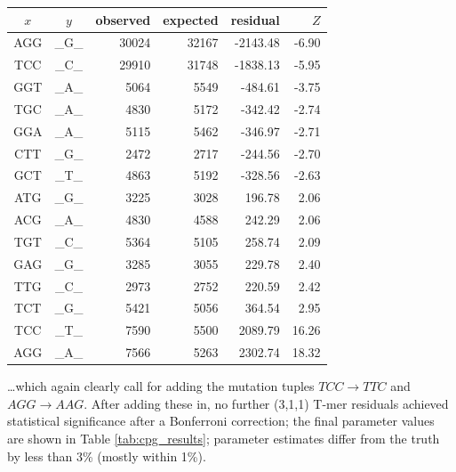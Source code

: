 \documentclass{article}
\newcommand{\nA}{\mbox{A}}  %
\newcommand{\nC}{\mbox{C}}
\newcommand{\nG}{\mbox{G}}
\newcommand{\nT}{\mbox{T}}
\theoremstyle{plain}
\theoremstyle{definition}
\begin{document}
    \begin{center}
        \begin{tabular}{ccrrrr}
            \hline
                $x$ & $y$ & observed &   expected &    residual &  $Z$ \\
                \hline
                \nA\nG\nG  &  \_\nG\_  &  30024  &  32167  &  -2143.48  &  -6.90 \\
                \nT\nC\nC  &  \_\nC\_  &  29910  &  31748  &  -1838.13  &  -5.95 \\
                \nG\nG\nT  &  \_\nA\_  &   5064  &   5549  &   -484.61  &  -3.75 \\
                \nT\nG\nC  &  \_\nA\_  &   4830  &   5172  &   -342.42  &  -2.74 \\
                \nG\nG\nA  &  \_\nA\_  &   5115  &   5462  &   -346.97  &  -2.71 \\
                \nC\nT\nT  &  \_\nG\_  &   2472  &   2717  &   -244.56  &  -2.70 \\
                \nG\nC\nT  &  \_\nT\_  &   4863  &   5192  &   -328.56  &  -2.63 \\
                \hline
                \nA\nT\nG  &  \_\nG\_  &   3225  &   3028  &    196.78  &   2.06  \\
                \nA\nC\nG  &  \_\nA\_  &   4830  &   4588  &    242.29  &   2.06  \\
                \nT\nG\nT  &  \_\nC\_  &   5364  &   5105  &    258.74  &   2.09  \\
                \nG\nA\nG  &  \_\nG\_  &   3285  &   3055  &    229.78  &   2.40  \\
                \nT\nT\nG  &  \_\nC\_  &   2973  &   2752  &    220.59  &   2.42  \\
                \nT\nC\nT  &  \_\nG\_  &   5421  &   5056  &    364.54  &   2.95  \\
                \nT\nC\nC  &  \_\nT\_  &   7590  &   5500  &   2089.79  &  16.26  \\
                \nA\nG\nG  &  \_\nA\_  &   7566  &   5263  &   2302.74  &  18.32  \\
                \hline                                                     
        \end{tabular}
    \end{center}
\ldots which again clearly call for adding the mutation tuples $TCC \to TTC$ and $AGG \to AAG$.
After adding these in, 
no further (3,1,1) T-mer residuals achieved
statistical significance after a Bonferroni correction;
the final parameter values are shown in Table \ref{tab:cpg_results};
parameter estimates differ from the truth by less than 3\% (mostly within 1\%).
\end{document}
